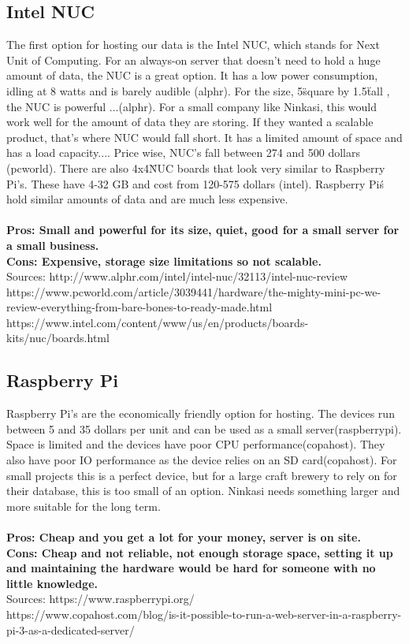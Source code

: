 \documentclass[draftclsnofoot,onecolumn,letterpaper,10pt,compsoc]{IEEEtran}
\begin{document}
	\subsection{Intel NUC}
            The first option for hosting our data is the Intel NUC, which stands for Next Unit of Computing.
						For an always-on server that doesn't need to hold a huge amount of data, the NUC is a great option.
						It has a low power consumption, idling at 8 watts and is barely audible (alphr). For the size, 5\" square by 1.5\" tall , the NUC is powerful ...(alphr).
						For a small company like Ninkasi, this would work well for the amount of data they are storing.
						If they wanted a scalable product, that’s where NUC would fall short.
						It has a limited amount of space and has a load capacity....
						Price wise, NUC's fall between 274 and 500 dollars (pcworld).
						There are also 4x4\" NUC boards that look very similar to Raspberry Pi's.
						These have 4-32 GB and cost from 120-575 dollars (intel).
						Raspberry Pi\'s hold similar amounts of data and are much less expensive.
				\\ \\
				\textbf{Pros: Small and powerful for its size, quiet, good for a small server for a small business.}
				\\
        \textbf{Cons: Expensive, storage size limitations so not scalable.}
						\\
        Sources:
        http://www.alphr.com/intel/intel-nuc/32113/intel-nuc-review
        https://www.pcworld.com/article/3039441/hardware/the-mighty-mini-pc-we-review-everything-from-bare-bones-to-ready-made.html
				https://www.intel.com/content/www/us/en/products/boards-kits/nuc/boards.html



	\subsection{Raspberry Pi}
			Raspberry Pi's are the economically friendly option for hosting.
			The devices run between 5 and 35 dollars per unit and can be used as a small server(raspberrypi).
			Space is limited and the devices have poor CPU performance(copahost). They also have poor IO performance as the device relies on an SD card(copahost).
			For small projects this is a perfect device, but for a large craft brewery to rely on for their database, this is too small of an option.
			Ninkasi needs something larger and more suitable for the long term.
			\\ \\
			\textbf{Pros: Cheap and you get a lot for your money, server is on site.}
			\\
			\textbf{Cons: Cheap and not reliable, not enough storage space, setting it up and maintaining the hardware would be hard for someone with no little knowledge.}
			\\
			Sources:
			https://www.raspberrypi.org/ \\
			https://www.copahost.com/blog/is-it-possible-to-run-a-web-server-in-a-raspberry-pi-3-as-a-dedicated-server/ \\ \\
\end{document}
